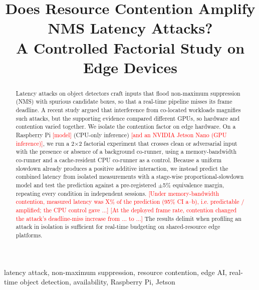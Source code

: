 \documentclass[conference]{IEEEtran}
\newcommand{\TODO}[1]{\textcolor{red}{[#1]}}
\begin{document}
\title{Does Resource Contention Amplify NMS Latency Attacks?\\
A Controlled Factorial Study on Edge Devices}

\author{\IEEEauthorblockN{\TODO{Author Name(s)}}
\IEEEauthorblockA{\TODO{Department, Institution}\\ \TODO{City, Country}\\ \TODO{email}}}

\maketitle

\begin{abstract}
Latency attacks on object detectors craft inputs that flood non-maximum suppression (NMS) with
spurious candidate boxes, so that a real-time pipeline misses its frame deadline. A recent study
argued that interference from co-located workloads magnifies such attacks, but the supporting
evidence compared different GPUs, so hardware and contention varied together. We isolate the
contention factor on edge hardware. On a Raspberry Pi \TODO{model} (CPU-only inference)
\TODO{and an NVIDIA Jetson Nano (GPU inference)}, we run a 2$\times$2 factorial experiment that
crosses clean or adversarial input with the presence or absence of a background co-runner, using a
memory-bandwidth co-runner and a cache-resident CPU co-runner as a control. Because a uniform
slowdown already produces a positive additive interaction, we instead predict the combined
latency from isolated measurements with a stage-wise proportional-slowdown model and test the
prediction against a pre-registered $\pm$5\% equivalence margin, repeating every condition in
independent sessions. \TODO{Under memory-bandwidth contention, measured latency was X\% of the
prediction (95\% CI a--b), i.e. predictable / amplified; the CPU control gave ...} \TODO{At the
deployed frame rate, contention changed the attack's deadline-miss increase from ... to ...}
The results delimit when profiling an attack in isolation is sufficient for real-time budgeting
on shared-resource edge platforms.
\end{abstract}

\begin{IEEEkeywords}
latency attack, non-maximum suppression, resource contention, edge AI, real-time object
detection, availability, Raspberry Pi, Jetson
\end{IEEEkeywords}
\end{document}
